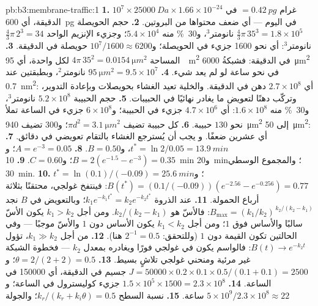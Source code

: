 \begin{solution}{pb:b3:membrane-traffic:1}
\textbf{1.} $10^{7}\times \qty{25000}{Da}\times 1.66\times 10^{-24}$ غرام
$= \qty{0.42}{pg}$ في الدقيقة، أي \qty{600}{pg} في اليوم --- أي ضعف محتواها
من البروتين.
\textbf{2.} حجم الحويصلة $\tfrac{4}{3}\pi\,35^{3} = 1.8\times 10^{5}$
نانومتر$^{3}$، و\qty{30}{\%} منه $5.4\times 10^{4}$؛ وجزيء الإنزيم الواحد
$\tfrac{4}{3}\pi\,2^{3} = 34$ نانومتر$^{3}$: أي نحو \num{1600} جزيء في
الحويصلة؛ و$10^{7}/1600 \approx 6200$ حويصلة في الدقيقة.
\textbf{3.} المساحة $4\pi\,35^{2} = \qty{0.0154}{\micro m^2}$ لكل واحدة، أي \qty{95}{\micro
m^2} في الدقيقة: فشبكةُ \qty{6000}{\micro m^2} في نحو
ساعة لو لم يعد شيء.
\textbf{4.} $\qty{95}{\micro m^2} = 9.5\times 10^{7}$ نانومتر$^{2}$، وبطبقتين
عند \qty{0.7}{nm^2}: أي $2.7\times 10^{8}$ دهن في الدقيقة. والخلية
تعيد الغشاء بحويصلات  وبإعادة التدوير، وتركّب دهنًا
لتعويض ما يغادر نهائيًا في الحبيبات.
\textbf{5.} حجم الحبيبة $5.2\times 10^{8}$ نانومتر$^{3}$، و\qty{30}{\%} منه
$1.6\times 10^{8}$: أي $4.7\times 10^{6}$ جزيء في الحبيبة؛ و$6\times
10^{8}$ جزيء في الساعة تملأ نحو $130$ حبيبة.
\textbf{6.} كل حبيبة تضيف $\pi d^{2} = \qty{3.1}{\micro m^2}$؛ و$300$
تضيف \qty{940}{\micro m^2} إلى \qty{50}{\micro m^2}: أي عشرين ضعفًا. و
يجب أن يُسترجع الغشاء بالتقام تعويضي في دقائق.
\textbf{7.} $t^{*} = \ln 2/0.05 = \qty{13.9}{min}$، و$B = 0.50$.
\textbf{8.} $A = e^{-3} = 0.05$؛ و$B = 2(e^{-1.5} - e^{-3}) = 0.35$؛
و$C = 0.60$.
\textbf{9.} \qty{10}{min} و\qty{20}{min}؛ والمجموع الوسطي \qty{30}{min}.
\textbf{10.} $t^{*} = \ln(0.1)/(-0.09) = \qty{25.6}{min}$؛ و$B(t^{*}) =
(0.1/(-0.09))(e^{-2.56} - e^{-0.256}) = 0.77$: فينتفخ غولجي،
محتقنًا بثلاثة أرباع الحمولة.
\textbf{11.} عند الذروة $k_{1}e^{-k_{1}t^{*}} = k_{2}e^{-k_{2}t^{*}}$؛
وبالتعويض في $B$ نجد $B_{\max} = (k_{1}/k_{2})^{\,k_{2}/(k_{2} -
k_{1})}$: فالأسّ هو $k_{2}/(k_{2} - k_{1})$. ومن أجل $k_{1} > k_{2}$ يكون
الأسّ سالبًا والأساس فوق $1$؛ ومن أجل $k_{1} < k_{2}$ يكون
الأساس دون $1$ والأسّ موجبًا --- وفي الحالتين تكون القيمة
دون $1$ (وللتحقق: $2^{-1} = 0.5$ هنا).
\textbf{12.} من أجل $k_{1} \gg k_{2}$، تؤول $B(t) \to e^{-k_{2}t}$: فالواسم
يكون في غولجي فورًا ويغادره بمعدل $k_{2}$ --- فخطوة الشبكة
غير مرئية ومنحني غولجي تلاشٍ بسيط.
\textbf{13.} $\theta = 2/(2+2) = 0.5$؛ و$J = \num{50000}\times 0.2\times
0.1\times 0.5/(0.1 + 0.1) = 2500$ جسيم في الدقيقة، أي \num{150000} في
الساعة.
\textbf{14.} $1.5\times 10^{5}\times 1500 = 2.3\times 10^{8}$ جزيء
كوليسترول في الساعة؛ و$5\times 10^{9}/2.3\times 10^{8} \approx 22$ ساعة.
\textbf{15.} نسبة السطح $k_{r}/(k_{r} + k_{i}\theta) = 0.5$؛ والجولة

\end{solution}
